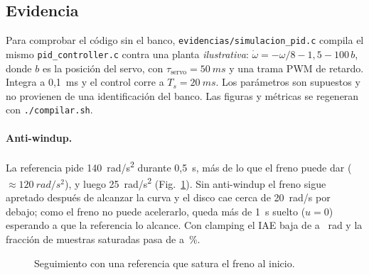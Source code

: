 

\subsection{Evidencia \simulado}
Para comprobar el código sin el banco, \texttt{evidencias/simulacion\_pid.c} compila el mismo
\texttt{pid\_controller.c} contra una planta \emph{ilustrativa}:
$\dot\omega = -\omega/8 - 1{,}5 - 100\,b$, donde $b$ es la posición del servo, con
$\tau_\text{servo}=\SI{50}{ms}$ y una trama PWM de retardo. Integra a 0,1~ms y el control corre
a $T_s=\SI{20}{ms}$. Los parámetros son supuestos y no provienen de una identificación del banco. Las
figuras y métricas se regeneran con \texttt{./compilar.sh}.

\paragraph{Anti-windup.} La referencia pide \SI{140}{rad/s^2} durante 0,5~s, más de lo que el
freno puede dar ($\approx\SI{120}{rad/s^2}$), y luego \SI{25}{rad/s^2}
(Fig.~\ref{fig:aw}). Sin anti-windup el freno sigue apretado después de alcanzar la curva y el
disco cae cerca de \SI{20}{rad/s} por debajo; como el freno no puede acelerarlo, queda más de
1~s suelto ($u=0$) esperando a que la referencia lo alcance. Con clamping el IAE baja de \iaeAwNo{} a
\iaeAwSi{}~rad y la fracción de muestras saturadas pasa de \satAwNo{} a \satAwSi{}\,\%.

\begin{figure}[h]
\centering
{}
\caption{\simulado{} Seguimiento con una referencia que satura el freno al inicio.}
\label{fig:aw}
\end{figure}

